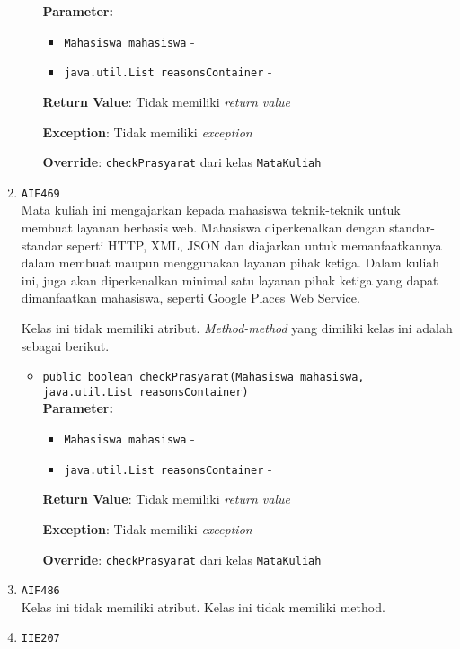 \documentclass{article}
\begin{document}
\begin{enumerate}
\begin{itemize}
\textbf{Parameter:}\begin{itemize}
\item \texttt{Mahasiswa mahasiswa} - 
\item \texttt{java.util.List reasonsContainer} - 
\end{itemize}
\textbf{Return Value}: Tidak memiliki \textit{return value}

\textbf{Exception}: Tidak memiliki \textit{exception}

\textbf{Override}: \texttt{checkPrasyarat} dari kelas \texttt{MataKuliah}

\end{itemize}
\item \texttt{AIF469}\\ 
Mata kuliah ini mengajarkan kepada mahasiswa teknik-teknik untuk membuat 
 layanan berbasis web. Mahasiswa diperkenalkan dengan standar-standar seperti 
 HTTP, XML, JSON dan diajarkan untuk memanfaatkannya dalam membuat maupun 
 menggunakan layanan pihak ketiga. Dalam kuliah ini, juga akan diperkenalkan 
 minimal satu layanan pihak ketiga yang dapat dimanfaatkan mahasiswa, seperti 
 Google Places Web Service.

Kelas ini tidak memiliki atribut. \textit{Method-method} yang dimiliki kelas ini adalah sebagai berikut.
\begin{itemize}
\item \texttt{public boolean checkPrasyarat(Mahasiswa mahasiswa, java.util.List reasonsContainer)}\\ 


\textbf{Parameter:}\begin{itemize}
\item \texttt{Mahasiswa mahasiswa} - 
\item \texttt{java.util.List reasonsContainer} - 
\end{itemize}
\textbf{Return Value}: Tidak memiliki \textit{return value}

\textbf{Exception}: Tidak memiliki \textit{exception}

\textbf{Override}: \texttt{checkPrasyarat} dari kelas \texttt{MataKuliah}

\end{itemize}
\item \texttt{AIF486}\\ 


Kelas ini tidak memiliki atribut. Kelas ini tidak memiliki method. \item \texttt{IIE207}\\ 



\end{enumerate}
\end{document}

